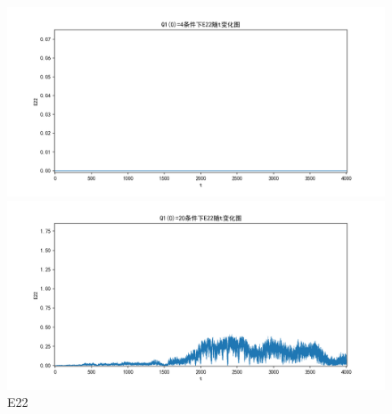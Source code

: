 \documentclass[10pt, a4paper]{article}
\begin{document}
    \begin{figure}[H]
        \begin{minipage}[t]{0.49\textwidth}
            \centering
            \includegraphics[width=\textwidth]{./q5_pics/cmp/E22.png}
        \end{minipage}
        \begin{minipage}[t]{0.49\textwidth}
            \centering
            \includegraphics[width=\textwidth]{./q5_pics/exp/E22.png}
        \end{minipage}
        \caption{E22}\label{fig:E22 in q5}
    \end{figure}
\end{document}
